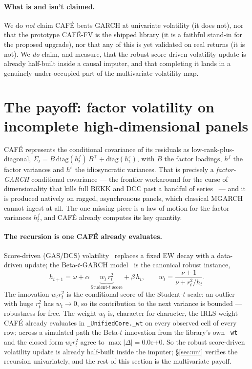 \documentclass[10pt,twocolumn]{article}
\newcommand{\cafe}{CAF\'E}
\newcommand{\fv}{\cafe{}-FV}
\begin{document}
\paragraph{What is and isn't claimed.} We do \emph{not} claim \cafe{} beats GARCH at
univariate volatility (it does not), nor that the prototype \fv{} is the shipped
library (it is a faithful stand-in for the proposed upgrade), nor that any of this is
yet validated on real returns (it is not). We \emph{do} claim, and measure, that the
robust score-driven volatility update is already half-built inside a causal imputer,
and that completing it lands in a genuinely under-occupied part of the multivariate
volatility map.

\section{The payoff: factor volatility on incomplete high-dimensional panels}
\label{sec:panel}
\cafe{} represents the conditional covariance of its residuals as low-rank-plus-diagonal,
$\Sigma_t=B\,\mathrm{diag}(h^f_t)\,B^\top+\mathrm{diag}(h^\varepsilon_t)$, with $B$ the
factor loadings, $h^f$ the factor variances and $h^\varepsilon$ the idiosyncratic
variances. That is precisely a \emph{factor-GARCH} conditional covariance --- the frontier
workaround for the curse of dimensionality that kills full BEKK and DCC past a handful of
series~\cite{engle2002dcc,bollerslev1990ccc} --- and it is produced natively on ragged,
asynchronous panels, which classical MGARCH cannot ingest at all. The one missing piece is
a law of motion for the factor variances $h^f_t$, and \cafe{} already computes its key
quantity.

\paragraph{The recursion is one \cafe{} already evaluates.} Score-driven (GAS/DCS)
volatility~\cite{creal2013gas,harvey2013} replaces a fixed EW decay with a data-driven
update; the Beta-$t$-GARCH model~\cite{harvey2013} is the canonical robust instance,
\begin{equation}
h_{t+1}=\omega+\alpha\,\underbrace{w_t\,r_t^2}_{\text{Student-}t\text{ score}}+\beta\,h_t,
\qquad w_t=\frac{\nu+1}{\nu+r_t^2/h_t}.
\label{eq:betat}
\end{equation}
The innovation $w_t r_t^2$ is the conditional score of the Student-$t$ scale: an outlier
with huge $r_t^2$ has $w_t\to0$, so its contribution to the next variance is bounded ---
robustness for free. The weight $w_t$ is, character for character, the IRLS weight \cafe{}
already evaluates in \texttt{\_UnifiedCore.\_wt} on every observed cell of every row; across
a simulated path the Beta-$t$ innovation from the library's own \texttt{\_wt} and the closed
form $w_t r_t^2$ agree to $\max|\Delta|=0.0$e$+$0. So the robust score-driven volatility
update is already half-built inside the imputer; \S\ref{sec:uni} verifies the recursion
univariately, and the rest of this section is the multivariate payoff.
\end{document}
